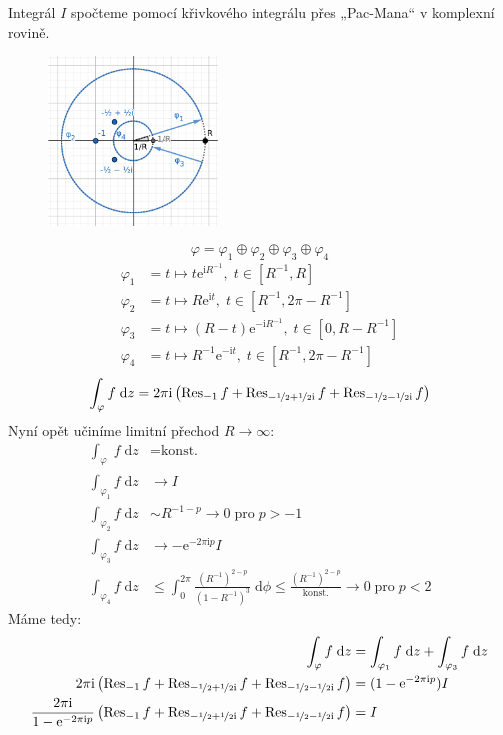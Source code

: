 \documentclass[10pt,a4paper]{article}
\def\ph{\phantom}
\newcommand{\const}[1]{\text{#1}}
\newcommand{\Res}{\operatorname{Res}}
\renewcommand{\d}[1]{\;\const{d}#1}
\newcommand{\e}[1]{\const{e}^{#1}}
\renewcommand{\i}{\const{i}}
\begin{document}
Integrál $I$ spočteme pomocí křivkového integrálu přes „Pac-Mana“ v komplexní rovině.
\begin{figure}[H]
    \centering
    \includegraphics[width=0.4\textwidth]{du3u2param.pdf}
\end{figure}
\begin{equation*}
    \varphi = \varphi_1 \oplus \varphi_2 \oplus \varphi_3 \oplus \varphi_4
\end{equation*}
\begin{align*}
    \varphi_1 &= t \mapsto t \e{\i R^{-1}}, \; t \in [R^{-1}, R] \\
    \varphi_2 &= t \mapsto R \e{\i t}, \; t \in [R^{-1}, 2\pi - R^{-1}] \\
    \varphi_3 &= t \mapsto (R - t) \e{-\i R^{-1}}, \; t \in [0, R - R^{-1}] \\
    \varphi_4 &= t \mapsto R^{-1} \e{-\i t}, \; t \in [R^{-1}, 2\pi - R^{-1}]
\end{align*}
\begin{equation*}
    \int_\varphi f \d{z} = 2\pi\i \left(
        \Res_{-1} f +
        \Res_{-\nicefrac{1}{2} + \nicefrac{1}{2} \i} f +
        \Res_{-\nicefrac{1}{2} - \nicefrac{1}{2} \i} f
    \right)
\end{equation*}
Nyní opět učiníme limitní přechod $R \to \infty$:
\begin{align*}
    \int_{\varphi_{\ph{1}}} f \d{z} &= \const{konst.} \\
    \int_{\varphi_1} f \d{z} &\to I \\
    \int_{\varphi_2} f \d{z} &\sim R^{-1-p} \to 0 \; \mathrm{pro} \; p>-1\\
    \int_{\varphi_3} f \d{z} &\to -\e{-2\pi\i p} I \\
    \int_{\varphi_4} f \d{z} &\leq \int_0^{2\pi} \frac{(R^{-1})^{2-p}}{(1-R^{-1})^3} \d{\phi} \leq \frac{(R^{-1})^{2-p}}{\const{konst.}} \to 0 \; \mathrm{pro} \; p<2
\end{align*}
Máme tedy:
\begin{align*}
    \int_\varphi f \d{z} &= \int_{\varphi_1} f \d{z} + \int_{\varphi_3} f \d{z}
    \\
    2\pi\i \left(
        \Res_{-1} f +
        \Res_{-\nicefrac{1}{2} + \nicefrac{1}{2} \i} f +
        \Res_{-\nicefrac{1}{2} - \nicefrac{1}{2} \i} f
    \right)
    &= (1 - \e{-2\pi\i p}) I
    \\
    \frac{2\pi\i}{1 - \e{-2\pi\i p}} \left(
        \Res_{-1} f +
        \Res_{-\nicefrac{1}{2} + \nicefrac{1}{2} \i} f +
        \Res_{-\nicefrac{1}{2} - \nicefrac{1}{2} \i} f
    \right)
    &= I
\end{align*}
\end{document}
